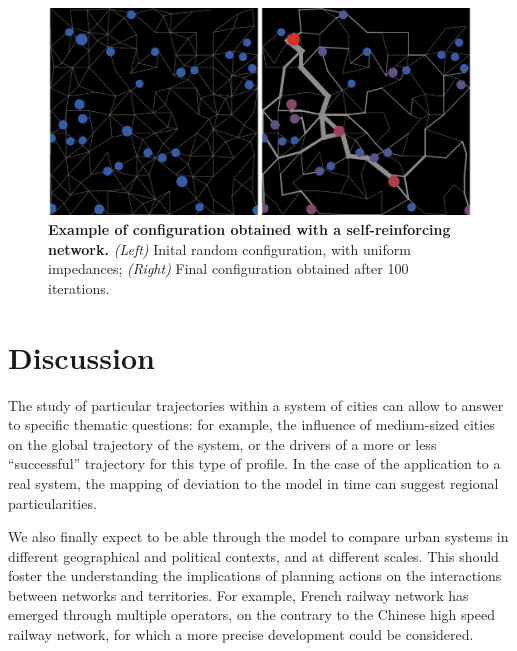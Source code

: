 \begin{figure}
	\includegraphics[width=\linewidth]{figures/6-2-3-fig-macrocoevol-slimemould}
	\caption[Example of application of the macroscopic model with a self-reinforcing network]{\textbf{Example of configuration obtained with a self-reinforcing network.} \textit{(Left)} Inital random configuration, with uniform impedances; \textit{(Right)} Final configuration obtained after 100 iterations.\label{fig:macrocoevolution:slimemould}}
\end{figure}




\section{Discussion}



The study of particular trajectories within a system of cities can allow to answer to specific thematic questions: for example, the influence of medium-sized cities on the global trajectory of the system, or the drivers of a more or less ``successful'' trajectory for this type of profile. In the case of the application to a real system, the mapping of deviation to the model in time can suggest regional particularities.


We also finally expect to be able through the model to compare urban systems in different geographical and political contexts, and at different scales. This should foster the understanding the implications of planning actions on the interactions between networks and territories. For example, French railway network has emerged through multiple operators, on the contrary to the Chinese high speed railway network, for which a more precise development could be considered.


